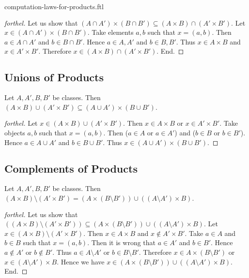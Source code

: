 \documentclass{naproche-library}
\begin{document}
\begin{smodule}{computation-laws-for-products.ftl}
\begin{proof}[forthel]
    Let us show that $(A \cap A') \times (B \cap B') \subseteq (A \times B) \cap (A' \times B')$.
      Let $x \in (A \cap A') \times (B \cap B')$.
      Take elements $a, b$ such that $x = (a, b)$.
      Then $a \in A \cap A'$ and $b \in B \cap B'$.
      Hence $a \in A, A'$ and $b \in B, B'$.
      Thus $x \in A \times B$ and $x \in A' \times B'$.
      Therefore $x \in (A \times B) \cap (A' \times B')$.
    End.
  \end{proof}


  \subsection*{Unions of Products}

  \begin{proposition}[forthel,id=FOUNDATIONS_05_7090174334861312,printid]
    Let $A, A', B, B'$ be classes.
    Then $(A \times B) \cup (A' \times B') \subseteq (A \cup A') \times (B \cup B')$.
  \end{proposition}
  \begin{proof}[forthel]
    Let $x \in (A \times B) \cup (A' \times B')$.
    Then $x \in A \times B$ or $x \in A' \times B'$.
    Take objects $a, b$ such that $x = (a, b)$.
    Then ($a \in A$ or $a \in A'$) and ($b \in B$ or $b \in B'$).
    Hence $a \in A \cup A'$ and $b \in B \cup B'$.
    Thus $x \in (A \cup A') \times (B \cup B')$.
  \end{proof}


  \subsection*{Complements of Products}

  \begin{proposition}[forthel,id=FOUNDATIONS_05_5552125989879808,printid]
    Let $A, A', B, B'$ be classes.
    Then $(A \times B) \setminus (A' \times B') = (A \times (B \setminus B')) \cup ((A \setminus A') \times B)$.
  \end{proposition}
  \begin{proof}[forthel]
    Let us show that $((A \times B) \setminus (A' \times B')) \subseteq (A \times (B \setminus B')) \cup ((A \setminus A') \times B)$.
      Let $x \in (A \times B) \setminus (A' \times B')$.
      Then $x \in A \times B$ and $x \notin A' \times B'$.
      Take $a \in A$ and $b \in B$ such that $x = (a, b)$.
      Then it is wrong that $a \in A'$ and $b \in B'$.
      Hence $a \notin A'$ or $b \notin B'$.
      Thus $a \in A \setminus A'$ or $b \in B \setminus B'$.
      Therefore $x \in A \times (B \setminus B')$ or $x \in (A \setminus A') \times B$.
      Hence we have $x \in (A \times (B \setminus B')) \cup ((A \setminus A') \times B)$.
    End.


\end{proof}
\end{smodule}
\end{document}
